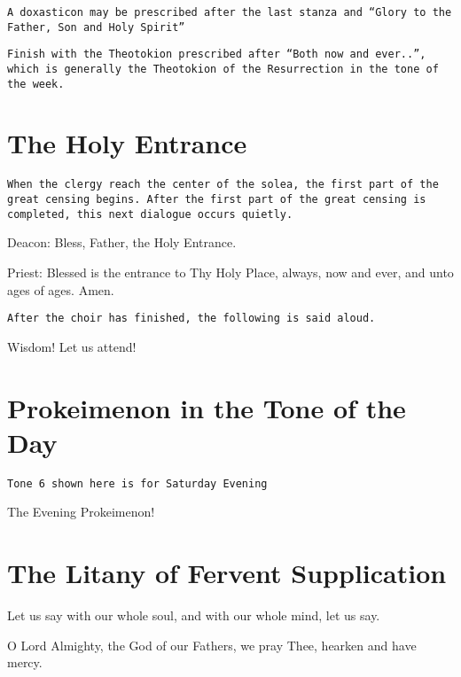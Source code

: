 \documentclass[twoside, letterpaper, 12pt]{report}
\newcommand{\instruction}[1]{%
  \texttt{\scriptsize{#1}}%
}
\newcommand{\centeredsection}[1]{%
  \needspace{10\baselineskip}%
  \section*{\centering{}#1}%
}
\begin{document}
\vbox{}
\instruction{A doxasticon may be prescribed after the last stanza and
``Glory to the Father, Son and Holy Spirit''}

\vbox{}
\instruction{Finish with the Theotokion prescribed after ``Both now and ever..'',
which is generally the Theotokion of the Resurrection in the tone of the week.
}
\cleardoublepage

\centeredsection{The Holy Entrance}

\instruction{When the clergy reach the center of the solea,
the first part of the great censing begins. After the first part of the great
censing is completed, this next dialogue occurs quietly.}

\vbox{}
{
\footnotesize
Deacon: Bless, Father, the Holy Entrance.

Priest: Blessed is the entrance to Thy Holy Place, always, now and ever, and unto ages of ages. Amen.
}

\vbox{}
\instruction{After the choir has finished, the following is said aloud.}

\begin{deacon}
\item Wisdom! Let us attend!
\end{deacon}


\centeredsection{Prokeimenon in the Tone of the Day}

\instruction{Tone 6 shown here is for Saturday Evening}

\begin{deacon}
    \item The Evening Prokeimenon!
\end{deacon}



\centeredsection{The Litany of Fervent Supplication}
\begin{deacon}
\item Let us say with our whole soul, and with our whole mind, let us say.
\end{deacon}

\begin{deacon}
\item O Lord Almighty, the God of our Fathers, we pray Thee, hearken and have mercy.
\end{deacon}
\end{document}
